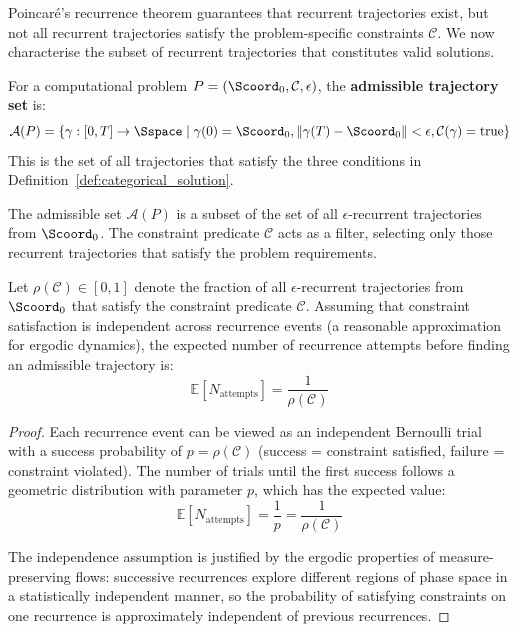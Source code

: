 Poincaré's recurrence theorem guarantees that recurrent trajectories exist, but not all recurrent trajectories satisfy the problem-specific constraints $\mathcal{C}$. We now characterise the subset of recurrent trajectories that constitutes valid solutions.

\begin{definition}
\label{def:admissible_set}
For a computational problem $P = (\Scoord_0, \mathcal{C}, \epsilon)$, the \textbf{admissible trajectory set} is:
\begin{equation}
\mathcal{A}(P) = \left\{ \gamma : [0,T] \to \Sspace \mid \gamma(0) = \Scoord_0, \|\gamma(T) - \Scoord_0\| < \epsilon, \mathcal{C}(\gamma) = \text{true} \right\}
\label{eq:admissible_set}
\end{equation}
This is the set of all trajectories that satisfy the three conditions in Definition~\ref{def:categorical_solution}.
\end{definition}

The admissible set $\mathcal{A}(P)$ is a subset of the set of all $\epsilon$-recurrent trajectories from $\Scoord_0$. The constraint predicate $\mathcal{C}$ acts as a filter, selecting only those recurrent trajectories that satisfy the problem requirements.

\begin{proposition}
\label{prop:admissibility_measure}
Let $\rho(\mathcal{C}) \in [0,1]$ denote the fraction of all $\epsilon$-recurrent trajectories from $\Scoord_0$ that satisfy the constraint predicate $\mathcal{C}$. Assuming that constraint satisfaction is independent across recurrence events (a reasonable approximation for ergodic dynamics), the expected number of recurrence attempts before finding an admissible trajectory is:
\begin{equation}
\mathbb{E}[N_{\text{attempts}}] = \frac{1}{\rho(\mathcal{C})}
\label{eq:expected_attempts}
\end{equation}
\end{proposition}

\begin{proof}
Each recurrence event can be viewed as an independent Bernoulli trial with a success probability of $p = \rho(\mathcal{C})$ (success = constraint satisfied, failure = constraint violated). The number of trials until the first success follows a geometric distribution with parameter $p$, which has the expected value:
\begin{equation}
\mathbb{E}[N_{\text{attempts}}] = \frac{1}{p} = \frac{1}{\rho(\mathcal{C})}
\end{equation}

The independence assumption is justified by the ergodic properties of measure-preserving flows: successive recurrences explore different regions of phase space in a statistically independent manner, so the probability of satisfying constraints on one recurrence is approximately independent of previous recurrences.
\end{proof}

